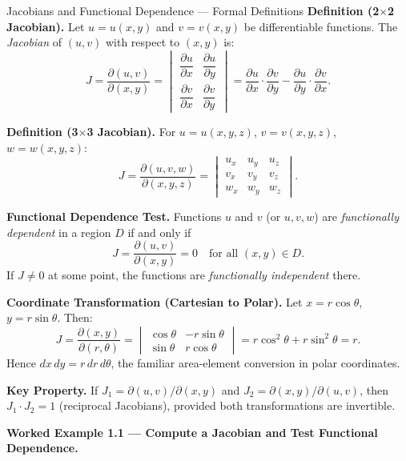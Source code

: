 \documentclass[12pt,a4paper]{article}
\begin{document}
\begin{infobox}{Jacobians and Functional Dependence --- Formal Definitions}
\textbf{Definition (2$\times$2 Jacobian).} Let \( u = u(x,y) \) and \( v = v(x,y) \) be differentiable functions. The \emph{Jacobian} of \( (u,v) \) with respect to \( (x,y) \) is:
\[
  J = \frac{\partial(u,v)}{\partial(x,y)}
    = \begin{vmatrix}
        \dfrac{\partial u}{\partial x} & \dfrac{\partial u}{\partial y} \\[8pt]
        \dfrac{\partial v}{\partial x} & \dfrac{\partial v}{\partial y}
      \end{vmatrix}
    = \frac{\partial u}{\partial x}\cdot\frac{\partial v}{\partial y}
      - \frac{\partial u}{\partial y}\cdot\frac{\partial v}{\partial x}.
\]

\textbf{Definition (3$\times$3 Jacobian).} For \( u = u(x,y,z) \), \( v = v(x,y,z) \), \( w = w(x,y,z) \):
\[
  J = \frac{\partial(u,v,w)}{\partial(x,y,z)}
    = \begin{vmatrix}
        u_x & u_y & u_z \\
        v_x & v_y & v_z \\
        w_x & w_y & w_z
      \end{vmatrix}.
\]

\textbf{Functional Dependence Test.} Functions \( u \) and \( v \) (or \( u,v,w \)) are \emph{functionally dependent} in a region \( D \) if and only if
\[
  J = \frac{\partial(u,v)}{\partial(x,y)} = 0 \quad \text{for all } (x,y) \in D.
\]
If \( J \neq 0 \) at some point, the functions are \emph{functionally independent} there.

\textbf{Coordinate Transformation (Cartesian to Polar).}
Let \( x = r\cos\theta \), \( y = r\sin\theta \). Then:
\[
  J = \frac{\partial(x,y)}{\partial(r,\theta)}
    = \begin{vmatrix}
        \cos\theta & -r\sin\theta \\
        \sin\theta &  r\cos\theta
      \end{vmatrix}
    = r\cos^{2}\!\theta + r\sin^{2}\!\theta = r.
\]
Hence \( dx\,dy = r\,dr\,d\theta \), the familiar area-element conversion in polar coordinates.

\textbf{Key Property.} If \( J_{1} = \partial(u,v)/\partial(x,y) \) and \( J_{2} = \partial(x,y)/\partial(u,v) \), then \( J_{1} \cdot J_{2} = 1 \) (reciprocal Jacobians), provided both transformations are invertible.
\end{infobox}

\noindent\textbf{Worked Example 1.1 --- Compute a Jacobian and Test Functional Dependence.}
\end{document}
